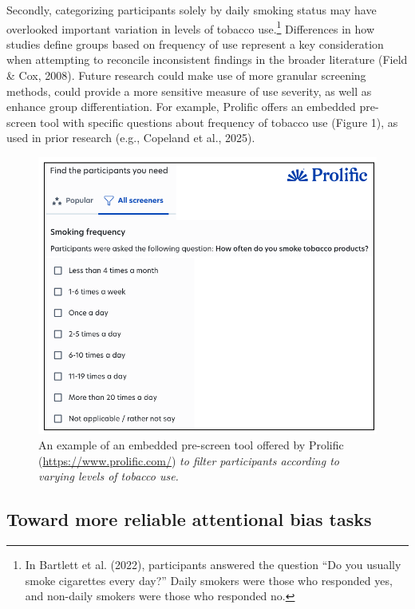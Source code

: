 \documentclass[authordate, empirical]{jote-new-article}
\begin{document}
	Secondly, categorizing participants solely by daily smoking status may have overlooked important variation in levels of tobacco use.\footnote{ In Bartlett et al. (2022), participants answered the question “Do you usually smoke cigarettes every day?” Daily smokers were those who responded yes, and non-daily smokers were those who responded no.} Differences in how studies define groups based on frequency of use represent a key consideration when attempting to reconcile inconsistent findings in the broader literature (Field \& Cox, 2008). Future research could make use of more granular screening methods, could provide a more sensitive measure of use severity, as well as enhance group differentiation. For example, Prolific offers an embedded pre-screen tool with specific questions about frequency of tobacco use (Figure 1), as used in prior research (e.g., Copeland et al., 2025).



	\begin{figure}
		\includegraphics[width=\linewidth]{media/image1.png}

		\caption{An example of an embedded pre-screen tool offered by Prolific (\url{https://www.prolific.com/}) \emph{to filter participants according to varying levels of tobacco use.}}

		\label{fig:rId11}


	\end{figure}





	\subsection{Toward more reliable attentional bias tasks}
\end{document}
